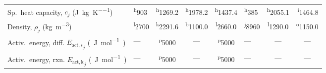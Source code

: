 \begin{table}[!htbp]
\begin{threeparttable}
{\begin{tabular}{@{} l l c c c l c r @{}}
                Sp.\ heat capacity, $c_j$ (\si{\joule\per\kilogram\per\kelvin}) & \textsuperscript{h}903  & \textsuperscript{h}1269.2 & \textsuperscript{h}1978.2 & \textsuperscript{h}1437.4 & \textsuperscript{h}385  & \textsuperscript{h}2055.1 & \textsuperscript{i}1464.8 \\
                Density, $\rho_j$ (\si{\kilogram\per\meter\cubed})              & \textsuperscript{l}2700 & \textsuperscript{k}2291.6 & \textsuperscript{b}1100.0 & \textsuperscript{l}2660.0 & \textsuperscript{j}8960 & \textsuperscript{l}1290.0 & \textsuperscript{o}1150.0 \\
                Activ.\ energy, diff. ${E_\mathrm{act,s}}_j$ \si{(J.mol^{-1})}  & ---                     & \textsuperscript{p}5000   & ---                       & \textsuperscript{p}5000   & ---                     & ---                       & \multicolumn{1}{c}{---}   \\
                Activ.\ energy, rxn. ${E_\mathrm{act,k}}_j$ \si{(J.mol^{-1})}   & ---                     & \textsuperscript{p}5000   & ---                       & \textsuperscript{p}5000   & ---                     & ---                       & \multicolumn{1}{c}{---}   \\

                \midrule
            \end{tabular}
        }


\end{threeparttable}
\end{table}
